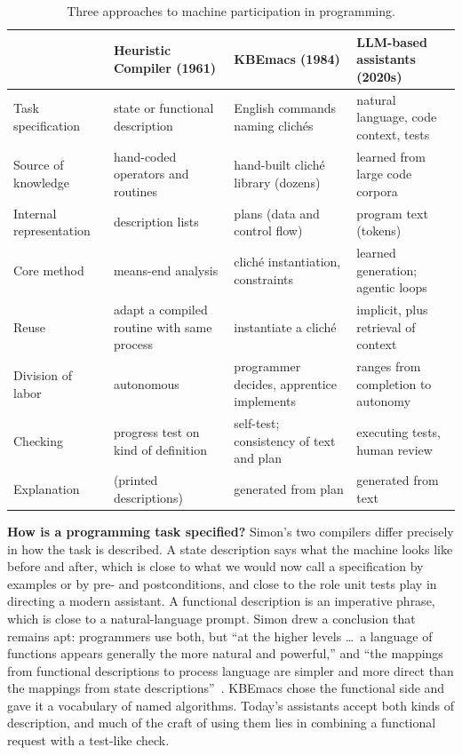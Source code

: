 \documentclass[11pt]{article}
\begin{document}
\begin{table}[H]
\centering
\caption{Three approaches to machine participation in programming.}
\label{tab:compare}
\footnotesize
\begin{tabular}{@{}p{}p{}p{}p{}@{}}
\toprule
 & \textbf{Heuristic Compiler (1961)} & \textbf{KBEmacs (1984)} & \textbf{LLM-based assistants (2020s)} \\ \midrule
Task specification & state or functional description & English commands naming clich\'es & natural language, code context, tests \\
Source of knowledge & hand-coded operators and routines & hand-built clich\'e library (dozens) & learned from large code corpora \\
Internal representation & description lists & plans (data and control flow) & program text (tokens) \\
Core method & means-end analysis & clich\'e instantiation, constraints & learned generation; agentic loops \\
Reuse & adapt a compiled routine with same process & instantiate a clich\'e & implicit, plus retrieval of context \\
Division of labor & autonomous & programmer decides, apprentice implements & ranges from completion to autonomy \\
Checking & progress test on kind of definition & self-test; consistency of text and plan & executing tests, human review \\
Explanation & (printed descriptions) & generated from plan & generated from text \\ \bottomrule
\end{tabular}
\end{table}

\textbf{How is a programming task specified?} Simon's two compilers
differ precisely in how the task is described. A state description
says what the machine looks like before and after, which is close to
what we would now call a specification by examples or by
pre- and postconditions, and close to the role unit tests play in
directing a modern assistant. A functional description is an imperative
phrase, which is close to a natural-language prompt. Simon drew a
conclusion that remains apt: programmers use both, but ``at the higher
levels \ldots\ a language of functions appears generally the more
natural and powerful,'' and ``the mappings from functional descriptions
to process language are simpler and more direct than the mappings from
state descriptions''~\cite[p.~506]{simon1963jacm}. KBEmacs chose the
functional side and gave it a vocabulary of named algorithms. Today's
assistants accept both kinds of description, and much of the craft of
using them lies in combining a functional request with a test-like
check.
\end{document}
